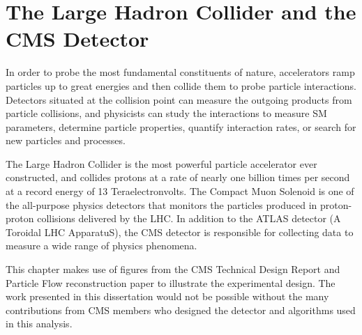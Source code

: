 \chapter{The Large Hadron Collider and the CMS Detector}
\label{ch:detector}

In order to probe the most fundamental constituents of nature, accelerators ramp particles up to great energies and then collide them to probe particle interactions. Detectors situated at the collision point can measure the outgoing products from particle collisions, and physicists can study the interactions to measure SM parameters, determine particle properties, quantify interaction rates, or search for new particles and processes.

The Large Hadron Collider is the most powerful particle accelerator ever constructed, and collides protons at a rate of nearly one billion times per second at a record energy of 13 Teraelectronvolts. The Compact Muon Solenoid is one of the all-purpose physics detectors that monitors the particles produced in proton-proton collisions delivered by the LHC. In addition to the ATLAS detector (A Toroidal LHC ApparatuS), the CMS detector is responsible for collecting data to measure a wide range of physics phenomena.





This chapter makes use of figures from the CMS Technical Design Report and Particle Flow reconstruction paper to illustrate the experimental design. The work presented in this dissertation would not be possible without the many contributions from CMS members who designed the detector and algorithms used in this analysis.

